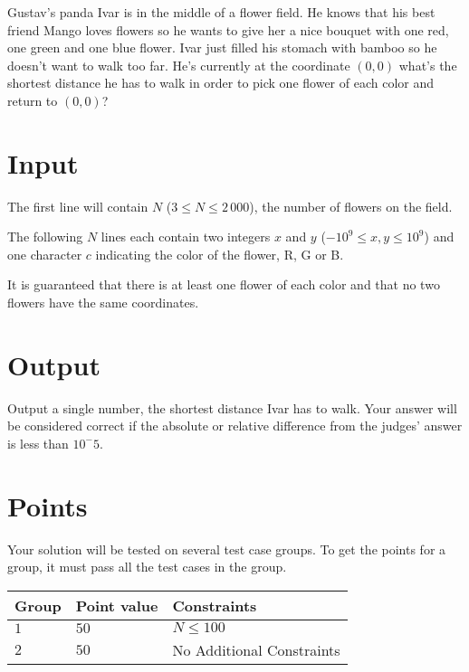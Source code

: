 \noindent

Gustav's panda Ivar is in the middle of a flower field.
He knows that his best friend Mango loves flowers so he wants to give her a nice bouquet with one red, one green and one blue flower.
Ivar just filled his stomach with bamboo so he doesn't want to walk too far.
He's currently at the coordinate $(0,0)$ what's the shortest distance he has to walk in order to pick one flower of each color and return to $(0,0)$?

\section*{Input}
The first line will contain $N$ ($3 \leq N \leq 2\,000$), the number of flowers on the field.

The following $N$ lines each contain two integers $x$ and $y$ ($-10^9 \leq x,y \leq 10^9$) and one character $c$ indicating the color of the flower, R, G or B.

It is guaranteed that there is at least one flower of each color and that no two flowers have the same coordinates.

\section*{Output}
Output a single number, the shortest distance Ivar has to walk.
Your answer will be considered correct if the absolute or relative difference from the judges' answer is less than $10^-5$.

\section*{Points}
Your solution will be tested on several test case groups. To get the points for
a group, it must pass all the test cases in the group.

\noindent
\begin{tabular}{| l | l | p{12cm} |}
  \hline
  \textbf{Group} & \textbf{Point value} & \textbf{Constraints} \\ \hline
  $1$    & $50$       & $N \leq 100$ \\ \hline
  $2$    & $50$       & No Additional Constraints \\ \hline
\end{tabular}
